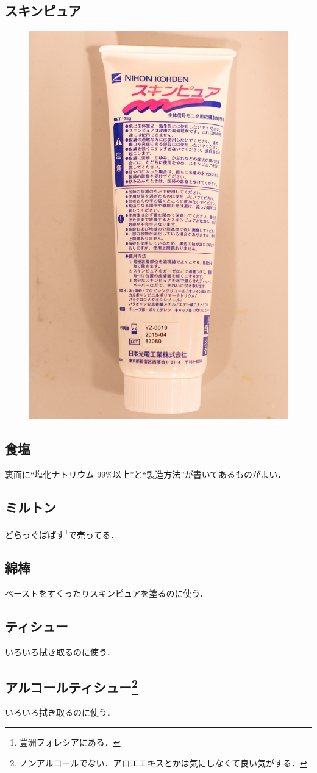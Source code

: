 \documentclass[a4j, twocolumn, openleft, uplatex, dvipdfmx]{jsbook}
\begin{document}
        \subsection*{スキンピュア}
            \begin{figure}[H]
                \centering
                \includegraphics[width=0.5\linewidth]{./figure/skinpure.jpg}
            \end{figure}
        \subsection*{食塩}
            裏面に``塩化ナトリウム 99\%以上''と``製造方法''が書いてあるものがよい．
        \subsection*{ミルトン}
            どらっぐぱぱす\footnote{豊洲フォレシアにある．}で売ってる．
        \subsection*{綿棒}
            ペーストをすくったりスキンピュアを塗るのに使う．
        \subsection*{ティシュー}
            いろいろ拭き取るのに使う．
        \subsection*{アルコールティシュー\footnote{ノンアルコールでない．アロエエキスとかは気にしなくて良い気がする．}}
            いろいろ拭き取るのに使う．
\end{document}
